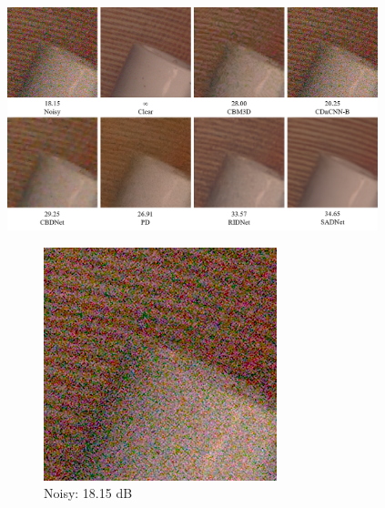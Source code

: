 \begin{figure}[b!]
    \centering
        \includegraphics[width=0.96\textwidth]{images/bardak.png}
        \begin{subfigure}{0.24\textwidth}
            \includegraphics[width=\linewidth]{images/bardak_noisy.png}
            \caption{Noisy: 18.15 dB}
            \label{fig:bardak_noisy}
        \end{subfigure}\hfil %
        \begin{subfigure}{0.24\textwidth}

\end{subfigure}
\end{figure}
